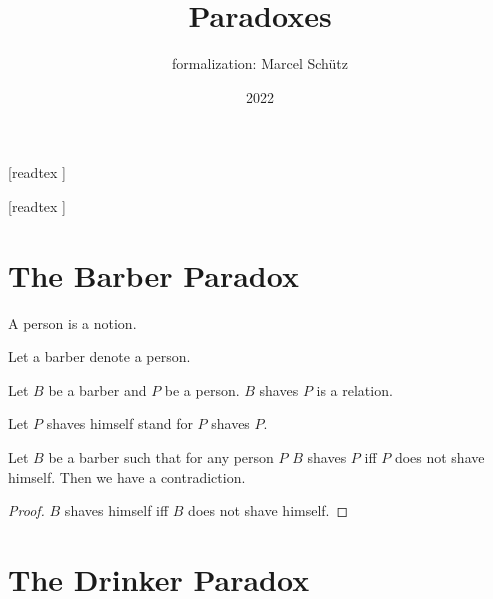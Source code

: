 \documentclass{article}
\title{Paradoxes}
\author{\Naproche formalization: Marcel Schütz}
\date{2022}
\begin{document}
  \maketitle

  \begin{forthel}

    [readtex ]

    [readtex ]
  \end{forthel}


  \section*{The Barber Paradox}

  \begin{forthel}
    \begin{signature}
      A person is a notion.
    \end{signature}

    Let a barber denote a person.

    \begin{signature}
      Let $B$ be a barber and $P$ be a person.
      $B$ shaves $P$ is a relation.
    \end{signature}

    Let $P$ shaves himself stand for $P$ shaves $P$.

    \begin{theorem}
      Let $B$ be a barber such that for any person $P$ $B$ shaves $P$ iff $P$
      does not shave himself.
      Then we have a contradiction.
    \end{theorem}
    \begin{proof}
      $B$ shaves himself iff $B$ does not shave himself.
    \end{proof}
  \end{forthel}


  \section*{The Drinker Paradox}
\end{document}
